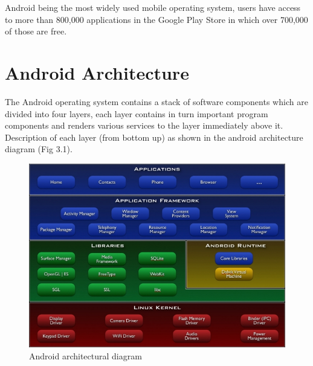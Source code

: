 Android being the most widely used mobile operating system, users have access to more than 800,000 applications in the Google Play Store in which over 700,000 of those are free.
 
\section{Android Architecture}
The Android operating system contains a stack of software components which are divided into four layers, each layer contains in turn important program components and renders various services to the layer immediately above it. Description of each layer (from bottom up) as shown in the android architecture diagram (Fig 3.1). 

\begin{figure}[ht!]
\centering
\includegraphics[width=150mm]{android_architecture.jpg}
\caption{Android architectural diagram }
\label{overflow}
\end{figure}


